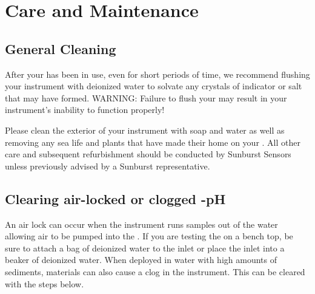 \section{Care and Maintenance}


\subsection{General Cleaning}

After your \instType{} has been in use, even for short periods of time, we recommend flushing your instrument with deionized water to solvate any crystals of indicator or salt that may have formed.
{\color{red} WARNING: Failure to flush your \instType{} may result in your instrument's inability to function properly!}

Please clean the exterior of your instrument with soap and water as well as removing any sea life and plants that have made their home on your \instType{}. All other care and subsequent refurbishment should be conducted by Sunburst Sensors unless previously advised by a Sunburst representative.


\subsection{Clearing air-locked or clogged \instType{}-pH}
\label{sec:AirLock}

An air lock can occur when the instrument runs samples out of the water allowing air to be pumped into the \instType{}. If you are testing the \instType{} on a bench top, be sure to attach a bag of deionized water to the inlet or place the inlet into a beaker of deionized water. When deployed in water with high amounts of sediments, materials can also cause a clog in the instrument.  This can be cleared with the steps below.

